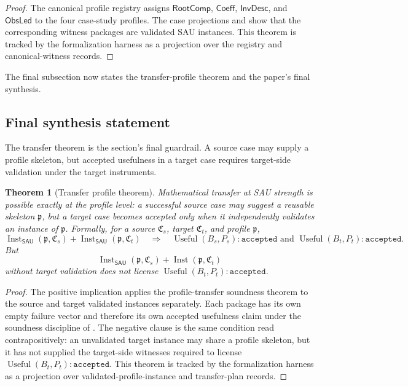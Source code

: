 \documentclass[11pt]{article}
\newcommand{\SAU}{\mathsf{SAU}}
\newcommand{\Use}{\operatorname{Useful}}
\newcommand{\Inst}{\operatorname{Inst}}
\newcommand{\RootComp}{\mathsf{RootComp}}
\newcommand{\Coeff}{\mathsf{Coeff}}
\newcommand{\InvDesc}{\mathsf{InvDesc}}
\newcommand{\ObsLed}{\mathsf{ObsLed}}
\newtheorem{theorem}{Theorem}[section]
\theoremstyle{definition}
\begin{document}
\begin{proof}
The canonical profile registry assigns \(\RootComp\), \(\Coeff\), \(\InvDesc\),
and \(\ObsLed\) to the four case-study profiles.  The case projections and
 show that the corresponding witness
packages are validated SAU instances.  This theorem is tracked by the
formalization harness as a projection over the registry and canonical-witness
records.
\end{proof}

The final subsection now states the transfer-profile theorem and the paper's
final synthesis.

\subsection{Final synthesis statement}
\label{subsec:transfer-final-synthesis}

The transfer theorem is the section's final guardrail.  A source case may supply
a profile skeleton, but accepted usefulness in a target case requires target-side
validation under the target instruments.

\begin{theorem}[Transfer profile theorem]
\label{thm:sau-transfer-profile-theorem}
Mathematical transfer at SAU strength is possible exactly at the profile level: a successful source case may suggest a reusable skeleton \(\mathfrak p\), but a target case becomes accepted only when it independently validates an instance of \(\mathfrak p\).  Formally, for a source \(\mathfrak C_s\), target \(\mathfrak C_t\), and profile \(\mathfrak p\),
\[
\Inst_{\SAU}(\mathfrak p,\mathfrak C_s)
+\Inst_{\SAU}(\mathfrak p,\mathfrak C_t)
\quad\Rightarrow\quad
\Use(B_s,P_s):\texttt{accepted}
\text{ and }
\Use(B_t,P_t):\texttt{accepted}.
\]
But
\[
\Inst_{\SAU}(\mathfrak p,\mathfrak C_s)
+\Inst(\mathfrak p,\mathfrak C_t)
\]
without target validation does not license \(\Use(B_t,P_t):\texttt{accepted}\).
\end{theorem}

\begin{proof}
The positive implication applies the profile-transfer soundness theorem to the
source and target validated instances separately.  Each package has its own empty
failure vector and therefore its own accepted usefulness claim under the
soundness discipline of .  The negative clause is the
same condition read contrapositively: an unvalidated target instance may share a
profile skeleton, but it has not supplied the target-side witnesses required to
license \(\Use(B_t,P_t):\texttt{accepted}\).  This theorem is tracked by the
formalization harness as a projection over validated-profile-instance and
transfer-plan records.
\end{proof}
\end{document}
